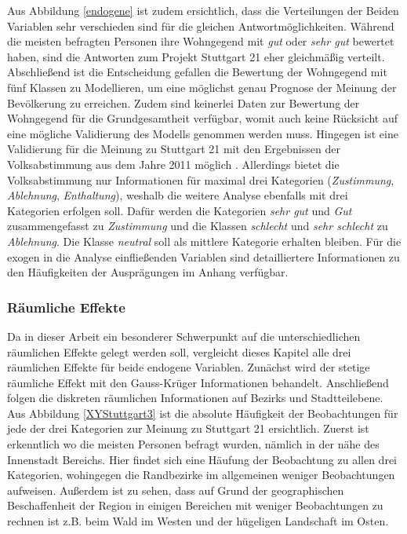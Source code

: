 \documentclass{Vorlage}
\begin{document}
Aus Abbildung \ref{endogene} ist zudem ersichtlich, dass die Verteilungen der Beiden Variablen sehr verschieden sind für die gleichen Antwortmöglichkeiten. Während die meisten befragten Personen ihre Wohngegend mit \textit{gut} oder \textit{sehr gut} bewertet haben, sind die Antworten zum Projekt Stuttgart 21 eher gleichmäßig verteilt.\\
Abschließend ist die Entscheidung gefallen die Bewertung der Wohngegend mit fünf Klassen zu Modellieren, um eine möglichst genau Prognose der Meinung der Bevölkerung zu erreichen. Zudem sind keinerlei Daten zur Bewertung der Wohngegend für die Grundgesamtheit verfügbar, womit auch keine Rücksicht auf eine mögliche Validierung des Modells genommen werden muss. Hingegen ist eine Validierung für die Meinung zu Stuttgart 21 mit den Ergebnissen der Volksabstimmung aus dem Jahre 2011 möglich \cite{Amt}. Allerdings bietet die Volksabstimmung nur Informationen für maximal drei Kategorien (\textit{Zustimmung}, \textit{Ablehnung}, \textit{Enthaltung}), weshalb die weitere Analyse ebenfalls mit drei Kategorien erfolgen soll. Dafür werden die Kategorien \textit{sehr gut} und \textit{Gut} zusammengefasst zu \textit{Zustimmung} und die Klassen \textit{schlecht} und \textit{sehr schlecht} zu \textit{Ablehnung}. Die Klasse \textit{neutral} soll als mittlere Kategorie erhalten bleiben. 
Für die exogen in die Analyse einfließenden Variablen sind detailliertere Informationen zu den Häufigkeiten der Ausprägungen im Anhang verfügbar. 

\newpage

\subsubsection{Räumliche Effekte}

Da in dieser Arbeit ein besonderer Schwerpunkt auf die unterschiedlichen räumlichen Effekte gelegt werden soll, vergleicht dieses Kapitel alle drei räumlichen Effekte für beide endogene Variablen. Zunächst wird der stetige räumliche Effekt mit den Gauss-Krüger Informationen behandelt. Anschließend folgen die diskreten räumlichen Informationen auf Bezirks und Stadtteilebene.\\
Aus Abbildung \ref{XYStuttgart3} ist die absolute Häufigkeit der Beobachtungen für jede der drei Kategorien zur Meinung zu Stuttgart 21 ersichtlich. Zuerst ist erkenntlich wo die meisten Personen befragt wurden, nämlich in der nähe des Innenstadt Bereichs. Hier findet sich eine Häufung der Beobachtung zu allen drei Kategorien, wohingegen die Randbezirke im allgemeinen weniger Beobachtungen aufweisen. Außerdem ist zu sehen, dass auf Grund der geographischen Beschaffenheit der Region in einigen Bereichen mit weniger Beobachtungen zu rechnen ist z.B. beim Wald im Westen und der hügeligen Landschaft im Osten.    
\end{document}
